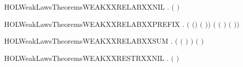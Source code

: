 \newcommand{\HOLWeakLawsTheoremsWEAKXXPREFXXRECXXEQUIV}{\UseVerbatim{HOLWeakLawsTheoremsWEAKXXPREFXXRECXXEQUIV}}
\begin{SaveVerbatim}{HOLWeakLawsTheoremsWEAKXXRELABXXNIL}
\HOLTokenTurnstile{} \HOLSymConst{\HOLTokenForall{}}.  \ensuremath{(}  \ensuremath{)} 
\end{SaveVerbatim}
\newcommand{\HOLWeakLawsTheoremsWEAKXXRELABXXNIL}{\UseVerbatim{HOLWeakLawsTheoremsWEAKXXRELABXXNIL}}
\begin{SaveVerbatim}{HOLWeakLawsTheoremsWEAKXXRELABXXPREFIX}
\HOLTokenTurnstile{} \HOLSymConst{\HOLTokenForall{}}  .
        \ensuremath{(} \ensuremath{(}\HOLSymConst{\ensuremath{\ldotp}}\ensuremath{)} \ensuremath{(} \ensuremath{)}\ensuremath{)}
         \ensuremath{(} \ensuremath{(} \ensuremath{)} \HOLSymConst{\ensuremath{\ldotp}}  \ensuremath{(} \ensuremath{)}\ensuremath{)}
\end{SaveVerbatim}
\newcommand{\HOLWeakLawsTheoremsWEAKXXRELABXXPREFIX}{\UseVerbatim{HOLWeakLawsTheoremsWEAKXXRELABXXPREFIX}}
\begin{SaveVerbatim}{HOLWeakLawsTheoremsWEAKXXRELABXXSUM}
\HOLTokenTurnstile{} \HOLSymConst{\HOLTokenForall{}}  .
        \ensuremath{(} \ensuremath{(} \HOLSymConst{\ensuremath{+}} \ensuremath{)} \ensuremath{)} \ensuremath{(}   \HOLSymConst{\ensuremath{+}}   \ensuremath{)}
\end{SaveVerbatim}
\newcommand{\HOLWeakLawsTheoremsWEAKXXRELABXXSUM}{\UseVerbatim{HOLWeakLawsTheoremsWEAKXXRELABXXSUM}}
\begin{SaveVerbatim}{HOLWeakLawsTheoremsWEAKXXRESTRXXNIL}
\HOLTokenTurnstile{} \HOLSymConst{\HOLTokenForall{}}.  \ensuremath{(}  \ensuremath{)} 
\end{SaveVerbatim}
\newcommand{\HOLWeakLawsTheoremsWEAKXXRESTRXXNIL}{\UseVerbatim{HOLWeakLawsTheoremsWEAKXXRESTRXXNIL}}
